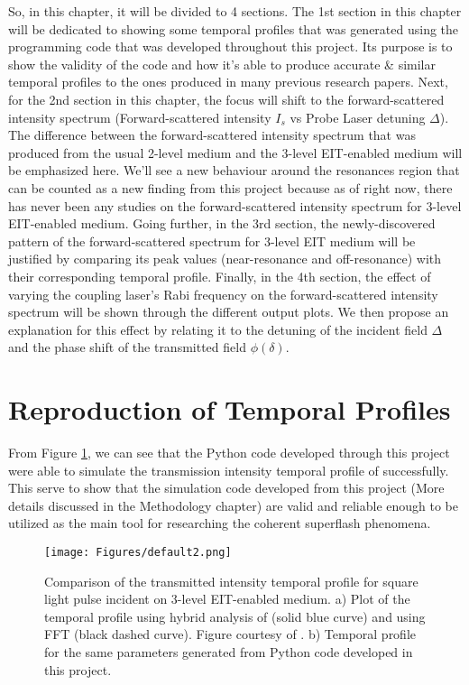 So, in this chapter, it will be divided to 4 sections. The 1st section in this chapter will be dedicated to showing some temporal profiles that was generated using the programming code that was developed throughout this project. Its purpose is to show the validity of the code and how it's able to produce accurate & similar temporal profiles to the ones produced in many previous research papers. Next, for the 2nd section in this chapter, the focus will shift to the forward-scattered intensity spectrum (Forward-scattered intensity $I_{s}$ vs Probe Laser detuning $\Delta$). The difference between the forward-scattered intensity spectrum that was produced from the usual 2-level medium and the 3-level EIT-enabled medium will be emphasized here. We'll see a new behaviour around the resonances region that can be counted as a new finding from this project because as of right now, there has never been any studies on the forward-scattered intensity spectrum for 3-level EIT-enabled medium. Going further, in the 3rd section, the newly-discovered pattern of the forward-scattered spectrum for 3-level EIT medium will be justified by comparing its peak values (near-resonance and off-resonance) with their corresponding temporal profile. Finally, in the 4th section, the effect of varying the coupling laser's Rabi frequency on the forward-scattered intensity spectrum will be shown through the different output plots. We then propose an explanation for this effect by relating it to the detuning of the incident field $\Delta$ and the phase shift of the transmitted field $\phi(\delta)$.

\section{Reproduction of Temporal Profiles}
From Figure \ref{fig: comparing temporal profile}, we can see that the Python code developed through this project were able to simulate the transmission intensity temporal profile of \cite{jeong2010slow} successfully. This serve to show that the simulation code developed from this project (More details discussed in the Methodology chapter) are valid and reliable enough to be utilized as the main tool for researching the coherent superflash phenomena.

\newpage

\begin{figure}[h!]
    \centering
    \texttt{[image: Figures/default2.png]}
    \caption{Comparison of the transmitted intensity temporal profile for square light pulse incident on 3-level EIT-enabled medium. a) Plot of the temporal profile using hybrid analysis of \cite{jeong2010slow} (solid blue curve) and using FFT (black dashed curve). Figure courtesy of \cite{jeong2010slow}. b) Temporal profile for the same parameters generated from Python code developed in this project.}
    \label{fig: comparing temporal profile}
\end{figure}

